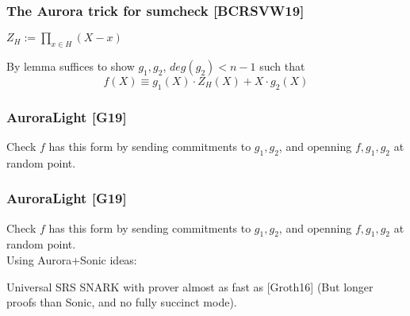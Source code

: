 \documentclass[shadesubsections,trans,14pt,mathserif]{beamer}
\newcommand{\defeq}{\ensuremath{:=}}
\begin{document}
  \begin{frame}
\frametitle{The Aurora trick for sumcheck \small{[BCRSVW19]}}
$Z_H \defeq \prod_{x\in H}(X-x)$
 \vspace{0.4in}

By lemma suffices to show $g_1,g_2$, $deg(g_2)<n-1$ such that
 \[ f(X)\equiv g_1(X)\cdot Z_H(X) +X\cdot g_2(X) \]
\end{frame}


  \begin{frame}
\frametitle{AuroraLight \small{[G19]}}
Check $f$ has this form by sending commitments to $g_1,g_2$,
and openning $f,g_1,g_2$ at random point.\\
 \vspace{0.4in}
% 
\end{frame}

  \begin{frame}
\frametitle{AuroraLight \small{[G19]}}
Check $f$ has this form by sending commitments to $g_1,g_2$,
and openning $f,g_1,g_2$ at random point.\\
 \vspace{0.4in}
Using Aurora+Sonic ideas:
\begin{corollary}
 Universal SRS SNARK with prover almost as fast as {\small{[Groth16]}}
 (But longer proofs than Sonic, and no fully succinct mode).
\end{corollary}

\end{frame}
\end{document}
